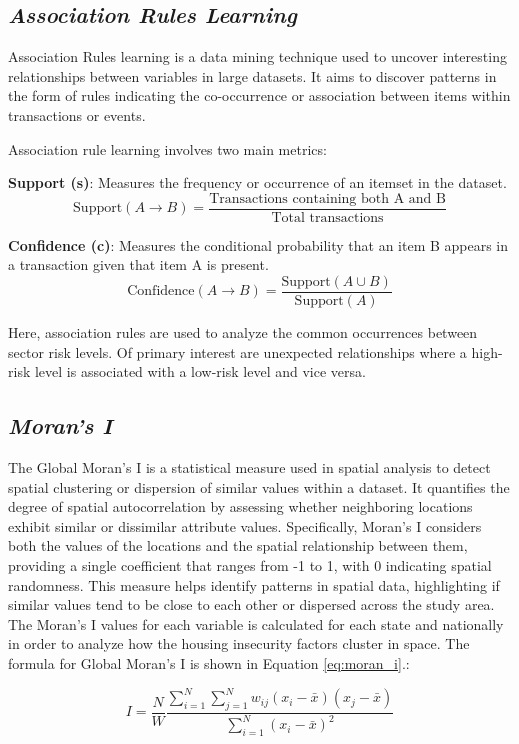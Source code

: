 \subsection{\textit{Association Rules Learning}}

Association Rules learning is a data mining technique used to uncover interesting relationships between variables in large datasets. It aims to discover patterns in the form of rules indicating the co-occurrence or association between items within transactions or events.

Association rule learning involves two main metrics:

\textbf{Support (s)}: Measures the frequency or occurrence of an itemset in the dataset.
\[
\text{Support}(A \rightarrow B) = \frac{\text{Transactions containing both A and B}}{\text{Total transactions}}
\]

\textbf{Confidence (c)}: Measures the conditional probability that an item B appears in a transaction given that item A is present.
\[
\text{Confidence}(A \rightarrow B) = \frac{\text{Support}(A \cup B)}{\text{Support}(A)}
\]

Here, association rules are used to analyze the common occurrences between sector risk levels. Of primary interest are unexpected relationships where a high-risk level is associated with a low-risk level and vice versa. 


\subsection{\textit{Moran's I}}
The Global Moran's I is a statistical measure used in spatial analysis to detect spatial clustering or dispersion of similar values within a dataset. It quantifies the degree of spatial autocorrelation by assessing whether neighboring locations exhibit similar or dissimilar attribute values. Specifically, Moran's I considers both the values of the locations and the spatial relationship between them, providing a single coefficient that ranges from -1 to 1, with 0 indicating spatial randomness. This measure helps identify patterns in spatial data, highlighting if similar values tend to be close to each other or dispersed across the study area. The Moran's I values for each variable is calculated for each state and nationally in order to analyze how the housing insecurity factors cluster in space. The formula for Global Moran's I is shown in Equation \ref{eq:moran_i}.:

\begin{equation}\label{eq:moran_i}
    I = \frac{N}{W} \frac{\sum_{i=1}^{N} \sum_{j=1}^{N} w_{ij} (x_i - \bar{x})(x_j - \bar{x})}{\sum_{i=1}^{N} (x_i - \bar{x})^2}
\end{equation}

